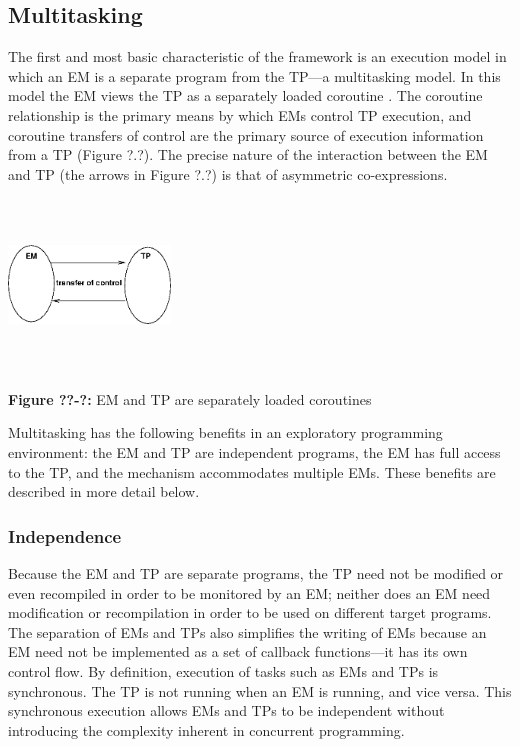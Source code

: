 \subsection{Multitasking}

The first and most basic characteristic of the framework is an
execution model in which an EM is a separate program from the TP---a
multitasking model.
In this model the EM views the TP as a separately loaded coroutine
  \cite{Marlin80}.  The coroutine
relationship is the primary means by which EMs control TP
execution, and coroutine transfers of 
control are the primary source of execution information from a TP
(Figure ?.?).  The precise nature of the interaction between the EM and
TP (the arrows in Figure ?.?) is that of asymmetric co-expressions.

\begin{center}
\includegraphics[width=1.7in,height=1.8in]{tpem.png}
\end{center}

{\sffamily\bfseries Figure ??-?:}
{\sffamily EM and TP are separately loaded coroutines}

\bigskip


Multitasking has the following benefits in an exploratory
programming environment: the EM and TP are independent programs, the
EM has full access to the TP, and the mechanism accommodates multiple
EMs.  These benefits are described in more detail below.


\subsubsection{Independence}

Because the EM and TP are separate programs, the TP need not be
modified or even recompiled in order to be monitored by an EM; neither
does an EM need modification or recompilation in order to be used on different
target programs.  The separation of EMs and TPs also simplifies the writing
of EMs because an EM need not be implemented as a set of callback
functions---it has its own control flow.  By definition, execution of
tasks such as EMs and TPs is synchronous.  The TP is not
running when an EM is running, and vice versa.  This synchronous
execution allows EMs and TPs to be independent without introducing the
complexity inherent in concurrent programming.

